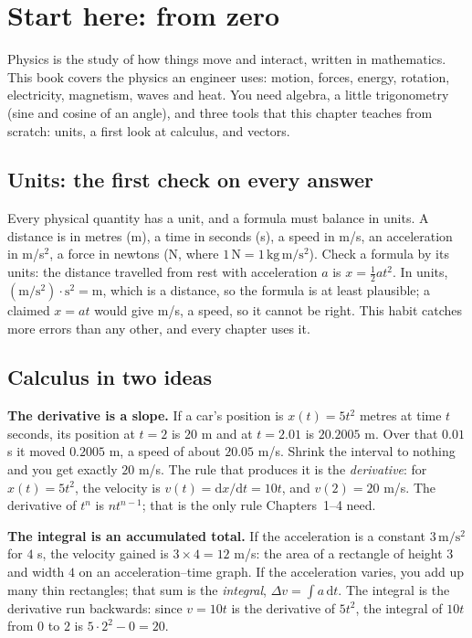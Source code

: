 \chapter*{Start here: from zero}

Physics is the study of how things move and interact, written in mathematics.
This book covers the physics an engineer uses: motion, forces, energy,
rotation, electricity, magnetism, waves and heat. You need algebra, a little
trigonometry (sine and cosine of an angle), and three tools that this chapter
teaches from scratch: units, a first look at calculus, and vectors.

\section*{Units: the first check on every answer}

Every physical quantity has a unit, and a formula must balance in units. A
distance is in metres (m), a time in seconds (s), a speed in m/s, an acceleration
in m/s$^2$, a force in newtons (N, where $1\,\mathrm{N}=1\,\mathrm{kg\,m/s^2}$).
Check a formula by its units: the distance travelled from rest with acceleration
$a$ is $x=\tfrac12at^2$. In units, $(\mathrm{m/s^2})\cdot\mathrm{s^2}=\mathrm{m}$, which is a distance, so the formula is
at least plausible; a claimed $x=at$ would give m/s, a speed, so it cannot be right.
This habit catches more errors than any other, and every chapter uses it.

\section*{Calculus in two ideas}

\textbf{The derivative is a slope.} If a car's position is $x(t)=5t^{2}$ metres at
time $t$ seconds, its position at $t=2$ is $20$ m and at $t=2.01$ is $20.2005$ m.
Over that $0.01$ s it moved $0.2005$ m, a speed of about $20.05$ m/s. Shrink the
interval to nothing and you get exactly $20$ m/s. The rule that produces it is the
\emph{derivative}: for $x(t)=5t^{2}$, the velocity is $v(t)=\mathrm{d}x/\mathrm{d}t=10t$, and $v(2)=20$ m/s.
The derivative of $t^{n}$ is $nt^{n-1}$; that is the only rule Chapters~1--4 need.

\textbf{The integral is an accumulated total.} If the acceleration is a constant
$3\,\mathrm{m/s^2}$ for $4$ s, the velocity gained is $3\times4=12$ m/s: the area of
a rectangle of height $3$ and width $4$ on an acceleration--time graph. If the acceleration
varies, you add up many thin rectangles; that sum is the \emph{integral},
$\Delta v=\int a\,\mathrm{d}t$. The integral is the derivative run backwards:
since $v=10t$ is the derivative of $5t^{2}$, the integral of $10t$ from $0$ to $2$
is $5\cdot2^{2}-0=20$.

